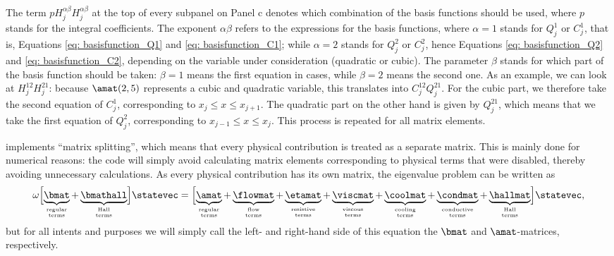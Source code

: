 The term $pH_j^{\alpha\beta}H_j^{\alpha\beta}$ at the top of every subpanel on Panel c denotes which combination of the basis functions should be used, where $p$ stands for the integral coefficients. The exponent $\alpha\beta$ refers to the expressions for the basis functions, where $\alpha = 1$ stands for $Q_j^1$ or $C_j^1$, that is, Equations \eqref{eq: basisfunction_Q1} and \eqref{eq: basisfunction_C1}; while $\alpha = 2$ stands for $Q_j^2$ or $C_j^2$, hence Equations \eqref{eq: basisfunction_Q2} and \eqref{eq: basisfunction_C2}, depending on the variable under consideration (quadratic or cubic). The parameter $\beta$ stands for which part of the basis function should be taken: $\beta = 1$ means the first equation in cases, while $\beta = 2$ means the second one. As an example, we can look at $H_j^{12}H_j^{21}$: because $\amat(2, 5)$ represents a cubic and quadratic variable, this translates into $C_j^{12}Q_j^{21}$. For the cubic part, we therefore take the second equation of $C_j^1$, corresponding to $x_j \leq x \leq x_{j + 1}$. The quadratic part on the other hand is given by $Q_j^{21}$, which means that we take the first equation of $Q_j^2$, corresponding to $x_{j-1} \leq x \leq x_j$. This process is repeated for all matrix elements.

{\legolas} implements ``matrix splitting'', which means that every physical contribution is treated as a separate matrix. This is mainly done for numerical reasons: the code will simply avoid calculating matrix elements corresponding to physical terms that were disabled, thereby avoiding unnecessary calculations. As every physical contribution has its own matrix, the eigenvalue problem can be written as
\begin{equation} \label{eq: matrix_splitting}
	\omega \Bigl[
	\underbrace{\bmat}_{\substack{\text{\tiny regular} \\ \text{\tiny terms}}}
	+ \underbrace{\bmathall}_{\substack{\text{\tiny Hall} \\ \text{\tiny terms}}}
	\Bigr]\statevec
	= \Bigl[
		\underbrace{\amat}_{\substack{\text{\tiny regular} \\ \text{\tiny terms}}}
		+ \underbrace{\flowmat}_{\substack{\text{\tiny flow} \\ \text{\tiny terms}}}
		+ \underbrace{\etamat}_{\substack{\text{\tiny resistive} \\ \text{\tiny terms}}}
		+ \underbrace{\viscmat}_{\substack{\text{\tiny viscous} \\ \text{\tiny terms}}}
		+ \underbrace{\coolmat}_{\substack{\text{\tiny cooling} \\ \text{\tiny terms}}}
		+ \underbrace{\condmat}_{\substack{\text{\tiny conductive} \\ \text{\tiny terms}}}
		+ \underbrace{\hallmat}_{\substack{\text{\tiny Hall} \\ \text{\tiny terms}}}
	\Bigr]\statevec,
\end{equation}
but for all intents and purposes we will simply call the left- and right-hand side of this equation the $\bmat$ and $\amat$-matrices, respectively.



